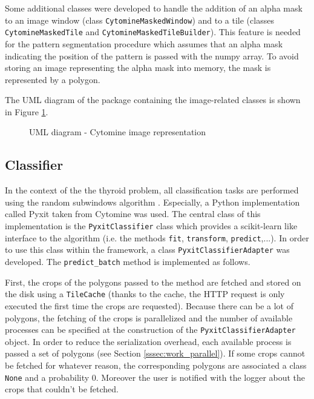 Some additional classes were developed to handle the addition of an alpha mask to an image window (class \texttt{CytomineMaskedWindow}) and to a tile (classes \texttt{CytomineMaskedTile} and \texttt{CytomineMaskedTileBuilder}). This feature is needed for the pattern segmentation procedure which assumes that an alpha mask indicating the position of the pattern is passed with the numpy array. To avoid storing an image representing the alpha mask into memory, the mask is represented by a polygon. 

The UML diagram of the package containing the image-related classes is shown in Figure \ref{fig:uml_cyto_im_repr}.

\begin{figure}
	\center
	\caption{UML diagram - Cytomine image representation}
	\label{fig:uml_cyto_im_repr}
\end{figure}

\subsection{Classifier}

In the context of the the thyroid problem, all classification tasks are performed using the random subwindows algorithm \cite{Maree201617}. Especially, a Python implementation called Pyxit taken from Cytomine \cite{maree2016collaborative} was used. The central class of this implementation is the \texttt{PyxitClassifier} class which provides a scikit-learn like interface to the algorithm (i.e. the methods \texttt{fit}, \texttt{transform}, \texttt{predict},...). In order to use this class within the framework, a class \texttt{PyxitClassifierAdapter} was developed. The \texttt{predict\_batch} method is implemented as follows.

 First, the crops of the polygons passed to the method are fetched and stored on the disk using a \texttt{TileCache} (thanks to the cache, the HTTP request is only executed the first time the crops are requested). Because there can be a lot of polygons, the fetching of the crops is parallelized and the number of available processes can be specified at the construction of the \texttt{PyxitClassifierAdapter} object. In order to reduce the serialization overhead, each available process is passed a set of polygons (see Section \ref{sssec:work_parallel}). If some crops cannot be fetched for whatever reason, the corresponding polygons are associated a class \texttt{None} and a probability 0. Moreover the user is notified with the logger about the crops that couldn't be fetched.

